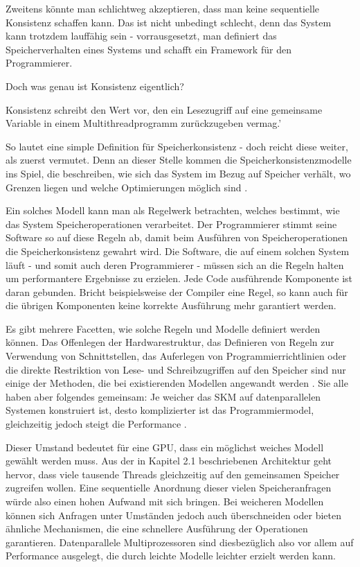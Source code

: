 \documentclass[final,bibliography=totocnumbered]{include/sikseminar}
\begin{document}
Zweitens könnte man schlichtweg akzeptieren, dass man keine sequentielle Konsistenz schaffen kann. Das ist nicht unbedingt schlecht, denn das System kann trotzdem lauffähig sein - vorrausgesetzt, man definiert 
das Speicherverhalten eines Systems und schafft ein Framework für den Programmierer\cite{ocofwmcm}.

Doch was genau ist Konsistenz eigentlich?


\glqq Konsistenz schreibt den Wert vor, den ein Lesezugriff auf eine gemeinsame Variable in einem Multithreadprogramm zurückzugeben vermag\cite{gpucc}.'\grqq

So lautet eine simple Definition für Speicherkonsistenz - doch reicht diese weiter, als zuerst vermutet.
Denn an dieser Stelle kommen die Speicherkonsistenzmodelle ins Spiel,
die beschreiben, wie sich das System im Bezug auf Speicher verhält, wo Grenzen liegen und welche Optimierungen möglich sind \cite{unified}.


Ein solches Modell kann man als Regelwerk betrachten, welches bestimmt, wie das System Speicheroperationen verarbeitet.
Der Programmierer stimmt seine Software so auf diese Regeln ab, damit beim Ausführen von Speicheroperationen die Speicherkonsistenz gewahrt wird.
Die Software, die auf einem solchen System läuft - und somit auch deren Programmierer - müssen sich an die Regeln halten um performantere Ergebnisse zu erzielen.
Jede Code ausführende Komponente ist daran gebunden. Bricht beispielsweise der Compiler eine Regel, so kann auch für die übrigen Komponenten keine korrekte Ausführung mehr garantiert werden.

Es gibt mehrere Facetten, wie solche Regeln und Modelle definiert werden können. Das Offenlegen der Hardwarestruktur, das Definieren von Regeln zur Verwendung von Schnittstellen, das Auferlegen von Programmierrichtlinien oder die direkte Restriktion von Lese- und Schreibzugriffen auf den Speicher sind nur einige der Methoden,
die bei existierenden Modellen angewandt werden \cite{pram}. Sie alle haben aber folgendes gemeinsam:
Je weicher das SKM auf datenparallelen Systemen konstruiert ist, desto komplizierter ist das Programmiermodel, gleichzeitig jedoch steigt die Performance \cite{mcm5,pram}.

Dieser Umstand bedeutet für eine GPU, dass ein möglichst weiches Modell gewählt werden muss. Aus der in Kapitel 2.1 beschriebenen Architektur geht hervor, dass viele tausende Threads gleichzeitig auf den gemeinsamen Speicher zugreifen wollen. Eine sequentielle Anordnung dieser vielen Speicheranfragen würde also einen hohen Aufwand mit sich bringen.
Bei weicheren Modellen können sich Anfragen unter Umständen jedoch auch überschneiden oder bieten ähnliche Mechanismen, die eine schnellere Ausführung der Operationen garantieren. Datenparallele Multiprozessoren sind diesbezüglich also vor allem auf Performance ausgelegt, die durch leichte Modelle leichter erzielt werden kann. 
\end{document}
